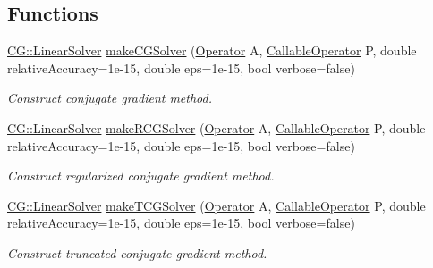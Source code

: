 \subsection*{Functions}
\begin{DoxyCompactItemize}
\item 
\hyperlink{classSpacy_1_1CG_1_1LinearSolver}{C\+G\+::\+Linear\+Solver} \hyperlink{group__CGGroup_gaafd9bf87164dd48991d2016aec8bad08_gaafd9bf87164dd48991d2016aec8bad08}{make\+C\+G\+Solver} (\hyperlink{group__SpacyGroup_ga3f89622eba80cf840b2a7102f1303455_ga3f89622eba80cf840b2a7102f1303455}{Operator} A, \hyperlink{group__SpacyGroup_ga2b74020d806ad800795cdd97dab3466f_ga2b74020d806ad800795cdd97dab3466f}{Callable\+Operator} P, double relative\+Accuracy=1e-\/15, double eps=1e-\/15, bool verbose=false)
\begin{DoxyCompactList}\small\item\em Construct conjugate gradient method. \end{DoxyCompactList}\item 
\hyperlink{classSpacy_1_1CG_1_1LinearSolver}{C\+G\+::\+Linear\+Solver} \hyperlink{group__CGGroup_gaf9ddae62858412fe5309d11aac7b8ed3_gaf9ddae62858412fe5309d11aac7b8ed3}{make\+R\+C\+G\+Solver} (\hyperlink{group__SpacyGroup_ga3f89622eba80cf840b2a7102f1303455_ga3f89622eba80cf840b2a7102f1303455}{Operator} A, \hyperlink{group__SpacyGroup_ga2b74020d806ad800795cdd97dab3466f_ga2b74020d806ad800795cdd97dab3466f}{Callable\+Operator} P, double relative\+Accuracy=1e-\/15, double eps=1e-\/15, bool verbose=false)
\begin{DoxyCompactList}\small\item\em Construct regularized conjugate gradient method. \end{DoxyCompactList}\item 
\hyperlink{classSpacy_1_1CG_1_1LinearSolver}{C\+G\+::\+Linear\+Solver} \hyperlink{group__CGGroup_ga5693f62a60708a49f51cf451991b96ec_ga5693f62a60708a49f51cf451991b96ec}{make\+T\+C\+G\+Solver} (\hyperlink{group__SpacyGroup_ga3f89622eba80cf840b2a7102f1303455_ga3f89622eba80cf840b2a7102f1303455}{Operator} A, \hyperlink{group__SpacyGroup_ga2b74020d806ad800795cdd97dab3466f_ga2b74020d806ad800795cdd97dab3466f}{Callable\+Operator} P, double relative\+Accuracy=1e-\/15, double eps=1e-\/15, bool verbose=false)
\begin{DoxyCompactList}\small\item\em Construct truncated conjugate gradient method. \end{DoxyCompactList}\item 

\end{DoxyCompactItemize}
